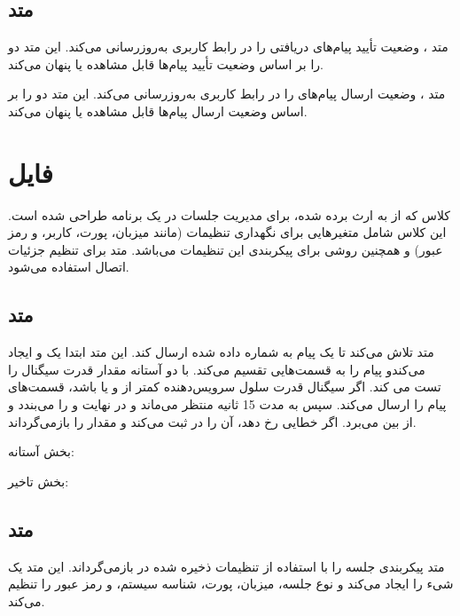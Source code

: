 \documentclass{report}
\begin{document}
\subsection{متد
	}
متد
، وضعیت تأیید پیام‌های دریافتی را در رابط کاربری به‌روزرسانی می‌کند. این متد دو 
را بر اساس وضعیت تأیید پیام‌ها قابل مشاهده یا پنهان می‌کند.

متد
، وضعیت ارسال پیام‌های
  را در رابط کاربری به‌روزرسانی می‌کند. این متد دو 
  را بر اساس وضعیت ارسال پیام‌ها قابل مشاهده یا پنهان می‌کند.
\section{فایل
}
کلاس 
 که از
   به ارث برده شده، برای مدیریت جلسات
     در یک برنامه
       طراحی شده است. این کلاس شامل متغیرهایی برای نگهداری تنظیمات
         (مانند میزبان، پورت، کاربر، و رمز عبور) و همچنین روشی برای پیکربندی این تنظیمات می‌باشد. متد
           برای تنظیم جزئیات اتصال
             استفاده می‌شود.

\subsection{متد
}
متد
 تلاش می‌کند تا یک پیام 
  به شماره داده شده ارسال کند. این متد ابتدا یک
   و 
   ایجاد می‌کندو پیام را به قسمت‌هایی تقسیم می‌کند. با دو آستانه مقدار قدرت سیگنال را تست می کند. اگر سیگنال قدرت سلول سرویس‌دهنده کمتر از 
   و یا
    باشد، قسمت‌های پیام را ارسال می‌کند. سپس به مدت 
    15 
    ثانیه منتظر می‌ماند و در نهایت 
    و 
    را می‌بندد و از بین می‌برد. اگر خطایی رخ دهد، آن را در 
     ثبت می‌کند و مقدار 
     را بازمی‌گرداند.
     
     بخش آستانه:

\begin{latin}
	
	\label{code:threshold}
\end{latin}
     بخش تاخیر:
\begin{latin}
	
	\label{code:delay}
\end{latin}

\subsection{متد
}
متد 
پیکربندی جلسه 
را با استفاده از تنظیمات ذخیره شده در
 بازمی‌گرداند. این متد یک شیء 
 را ایجاد می‌کند و نوع جلسه، میزبان، پورت، شناسه سیستم، و رمز عبور را تنظیم می‌کند.
 
\end{document}
